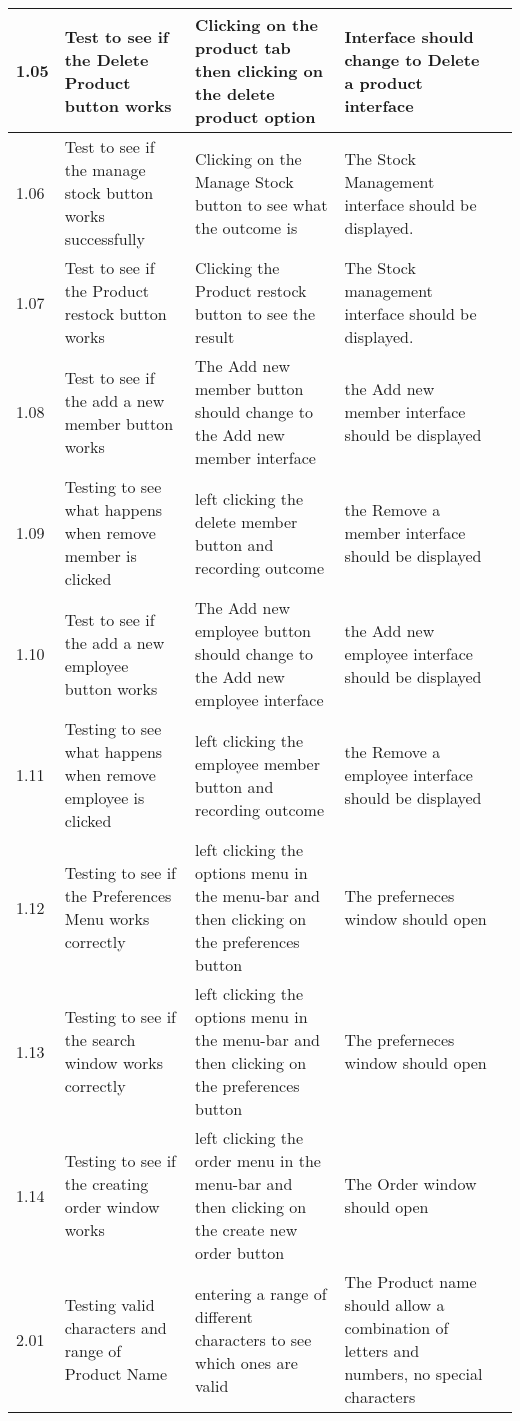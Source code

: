 \begin{flushleft}
\begin{longtable}{|p{1cm}|p{2.5cm}|p{2.5cm}|p{2cm}|p{2cm}|}
	1.05 & Test to see if the Delete Product button works & Clicking on the product tab then clicking on the delete product option & Interface should change to Delete a product interface& \\ \hline
	1.06 & Test to see if the manage stock button works successfully & Clicking on the Manage Stock button to see what the outcome is & The Stock Management interface should be displayed. & \\ \hline
	\rowcolor{dark-grey}1.07 & Test to see if the Product restock button works & Clicking the Product restock button to see the result & The Stock management interface should be displayed. & \\ \hline
	1.08 & Test to see if the add a new member button works & The Add new member button should change to the Add new member interface & the Add new member interface should be displayed& \\ \hline
	1.09 & Testing to see what happens when remove member is clicked & left clicking the delete member button and recording outcome & the Remove a member interface should be displayed & \\ \hline
	1.10 & Test to see if the add a new employee button works & The Add new employee button should change to the Add new employee interface &  the Add new employee interface should be displayed& \\ \hline
	1.11 & Testing to see what happens when remove employee is clicked & left clicking the employee member button and recording outcome & the Remove a employee interface should be displayed & \\ \hline
	\rowcolor{light-grey}1.12 & Testing to see if the Preferences Menu works correctly & left clicking the options menu in the menu-bar and then clicking on the preferences button & The preferneces window should open & \\ \hline
	\rowcolor{light-grey}1.13 & Testing to see if the search window works correctly & left clicking the options menu in the menu-bar and then clicking on the preferences button & The preferneces window should open & \\ \hline
	\rowcolor{light-grey}1.14 & Testing to see if the creating order window works & left clicking the order menu in the menu-bar and then clicking on the create new order button & The Order  window should open & \\ \hline
	2.01 & Testing valid characters and range of Product Name & entering a range of different characters to see which ones are valid & The Product name should allow a combination of letters and numbers, no special characters & \\ \hline

\end{longtable}
\end{flushleft}
